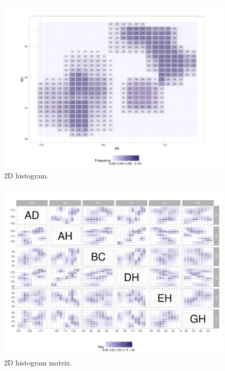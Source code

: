 \documentclass[article]{jss}
\begin{document}
\begin{appendix}
\begin{figure}[t!]
\centering
\includegraphics[width=1\textwidth]{pic/2Dhist}
\caption{\label{fig:2Dhist} 2D histogram.}
\end{figure}



\begin{figure}[t!]
\centering
\includegraphics[width=1\textwidth]{pic/2DhistMatrix}
\caption{\label{fig:2DhistMatrix} 2D histogram matrix.}
\end{figure}




\end{appendix}
\end{document}
